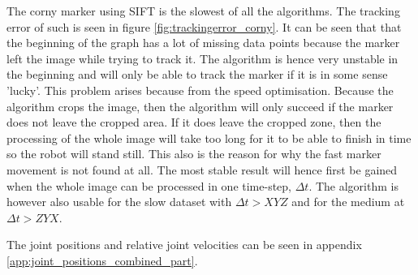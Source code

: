 The corny marker using SIFT is the slowest of all the algorithms.
The tracking error of such is seen in figure \ref{fig:trackingerror_corny}.
It can be seen that that the beginning of the graph has a lot of missing data points because the marker left the image while trying to track it.
The algorithm is hence very unstable in the beginning and will only be able to track the marker if it is in some sense 'lucky'.
This problem arises because from the speed optimisation.
Because the algorithm crops the image, then the algorithm will only succeed if the marker does not leave the cropped area.
If it does leave the cropped zone, then the processing of the whole image will take too long for it to be able to finish in time so the robot will stand still.
This also is the reason for why the fast marker movement is not found at all.
The most stable result will hence first be gained when the whole image can be processed in one time-step, $\Delta t$.
The algorithm is however also usable for the slow dataset with $\Delta t > XYZ$ and for the medium at $\Delta t > ZYX$.



The joint positions and relative joint velocities can be seen in appendix \ref{app:joint_positions_combined_part}.